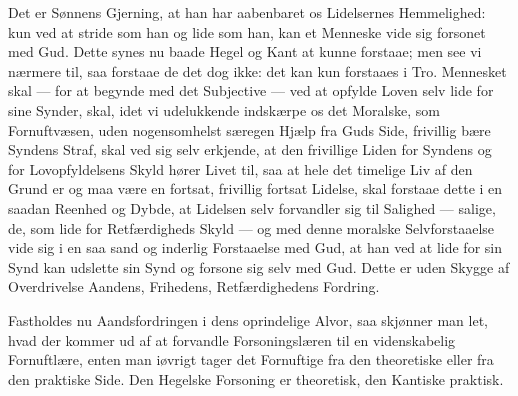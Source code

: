 \documentclass[12pt]{book}
\begin{document}
Det er Sønnens Gjerning, at han har aabenbaret os Lidelsernes
Hemmelighed: kun ved at stride som han og lide som han, kan et
Menneske vide sig forsonet med Gud. Dette synes nu baade Hegel og
Kant at kunne forstaae; men see vi nærmere til, saa forstaae de det
dog ikke: det kan kun forstaaes i Tro. Mennesket skal --- for at
begynde med det Subjective --- ved at opfylde Loven
selv lide for sine Synder, skal, idet vi udelukkende indskærpe os
det Moralske, som Fornuftvæsen, uden nogensomhelst særegen Hjælp fra
Guds Side, frivillig bære Syndens Straf, skal ved sig selv
erkjende, at den frivillige Liden for Syndens og for Lovopfyldelsens
Skyld hører Livet til, saa at hele det timelige Liv af den Grund er
og maa være en fortsat, frivillig fortsat Lidelse, skal forstaae
dette i en saadan Reenhed og Dybde, at Lidelsen selv forvandler sig
til Salighed --- salige, de, som lide for Retfærdigheds Skyld ---
og med denne moralske Selvforstaaelse vide sig i en saa sand og
inderlig Forstaaelse med Gud, at han ved at lide for sin Synd kan
udslette sin Synd og forsone sig selv med Gud. Dette er uden Skygge
af Overdrivelse Aandens, Frihedens, Retfærdighedens Fordring.

Fastholdes nu Aandsfordringen i dens oprindelige Alvor, saa skjønner
man let, hvad der kommer ud af at forvandle Forsoningslæren til en
videnskabelig Fornuftlære, enten man iøvrigt tager det Fornuftige
fra den theoretiske eller fra den praktiske Side. Den Hegelske
Forsoning er theoretisk, den Kantiske praktisk.
\end{document}
